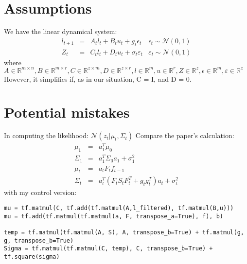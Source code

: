 \documentclass[twoside]{article}
\begin{document}
\section{Assumptions}
We have the linear dynamical system:\[\begin{array}{lclr}l_{t+1} & = & A_{t}l_{t}+B_{t}u_{t}+g_{t}\epsilon_{t}&\epsilon_{t}\sim\mathcal{N}(0,1) \\ Z_{t} & = & C_{t}l_{t} + D_{t}u_{t} + \sigma_{t}\varepsilon_{t} & \varepsilon_{t}\sim\mathcal{N}(0,1)\end{array}\]
where $A\in\mathbb{R}^{m\times n}, B\in\mathbb{R}^{m\times r}, C\in\mathbb{R}^{z\times m}, D\in\mathbb{R}^{z\times r}, l\in\mathbb{R}^{m}, u\in\mathbb{R}^{r}, Z\in\mathbb{R}^{z}, \epsilon\in\mathbb{R}^{m}, \varepsilon\in\mathbb{R}^{z}$
However, it simplifies if, as in our situation, C = I, and D = 0.

\section{Potential mistakes}
In computing the likelihood: $\mathcal{N}(z_{t}|\mu_{t},\Sigma_{t})$
Compare the paper's calculation:\[\begin{array}{lcl} \mu_{1} & = & a_{1}^{T}\mu_{0} \\ \Sigma_{1} & = & a_{1}^{T}\Sigma_{0}a_{1} + \sigma_{1}^{2} \\ \mu_{t} & = & a_{t}F_{t}f_{t-1} \\ \Sigma_{t} & = & a_{t}^{T}(F_{t}S_{t}F_{t}^{T}+g_{t}g_{t}^{T})a_{t}+\sigma_{t}^{2}\end{array}\]
with my control version:
\begin{lstlisting}
mu = tf.matmul(C, tf.add(tf.matmul(A,l_filtered), tf.matmul(B,u)))
mu = tf.add(tf.matmul(tf.matmul(a, F, transpose_a=True), f), b)

temp = tf.matmul(tf.matmul(A, S), A, transpose_b=True) + tf.matmul(g, g, transpose_b=True)
Sigma = tf.matmul(tf.matmul(C, temp), C, transpose_b=True) + tf.square(sigma)
\end{lstlisting}
\end{document}
